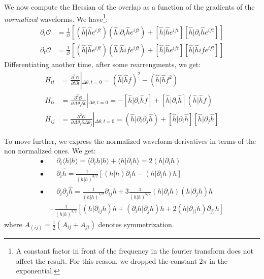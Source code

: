 \documentclass[twocolumn,showpacs,preprintnumbers,nofootinbib,prd,
superscriptaddress,10pt]{revtex4-1}
\newcommand{\scalar}[2]{\langle #1|#2 \rangle}
\newcommand{\rescalar}[2]{( #1|#2 )}
\newcommand{\imscalar}[2]{[ #1|#2 ]}
\begin{document}
We now compute the Hessian of the overlap as a function of the gradients of the {\it normalized} waveforms.
We have\footnote{
A constant factor in front of the frequency in the fourier transform does not affect the result. For this reason, we dropped the constant $2\pi$ in the exponential.}:
\begin{align}
	\partial_i \mathcal{O} &= \frac{1}{\mathcal{O}} \left[ \rescalar{\hat{h}}{\hat{h}e^{ift}}\rescalar{\hat{h}}{\partial_i\hat{h}e^{ift}} + \imscalar{\hat{h}}{\hat{h}e^{ift}}\imscalar{\hat{h}}{\partial_i\hat{h}e^{ift}} \right]\\
	\partial_t \mathcal{O} &= \frac{1}{\mathcal{O}} \left[ \rescalar{\hat{h}}{\hat{h}e^{ift}}\rescalar{\hat{h}}{\hat{h}if e^{ift}} + \imscalar{\hat{h}}{\hat{h}e^{ift}}\imscalar{\hat{h}}{\hat{h}if e^{ift}} \right]
\end{align}
Differentiating another time, after some rearrengments, we get:
\begin{align}
H_{tt} &= \frac{\partial^2 \mathcal{O}}{\partial t \partial t } \left|_{\Delta\theta, t = 0}
								= \rescalar{\hat{h}}{\hat{h}f}^2 - \rescalar{\hat{h}}{\hat{h}f^2} \label{eq:H_tt}\\
H_{ti} &= \frac{\partial^2 \mathcal{O}}{\partial \Delta \theta_i \partial t } \left|_{\Delta\theta, t = 0}
								= - \imscalar{\hat{h}}{\partial_i \hat{h}f} + \imscalar{\hat{h}}{\partial_i\hat{h}} \rescalar{\hat{h}}{\hat{h}f} \label{eq:H_ti}\\
H_{ij} &= \frac{\partial^2 \mathcal{O}}{\partial \Delta \theta_i \partial \Delta \theta_j }\left|_{\Delta\theta, t = 0}
								= \rescalar{\hat{h}}{\partial_i\partial_j\hat{h}} +\imscalar{\hat{h}}{\partial_i\hat{h}} \imscalar{\hat{h}}{\partial_j\hat{h}} \label{eq:H_ij}
\end{align}

To move further, we express the normalized waveform derivatives in terms of the non normalized ones. We get:
\begin{align*}
	\bullet&\quad \partial_i \scalar{h}{h} = \scalar{\partial_i h}{h}+ \scalar{h}{\partial_i h} = 2 \rescalar{h}{\partial_i h} \\
	\bullet&\quad \partial_i \hat{h} =\frac{1}{\rescalar{h}{h}^{3/2}} \left[ \rescalar{h}{h}\partial_i h -  \rescalar{h}{\partial_i h} h \right]	\\
	\bullet &\quad \partial_i \partial_j \hat{h} = \frac{1}{\rescalar{h}{h}^{1/2}} \partial_{ij}h 	+3 \frac{1}{\rescalar{h}{h}^{5/2}} \rescalar{h}{\partial_i h}\rescalar{h}{\partial_j h}h \\
	&- \frac{1}{\rescalar{h}{h}^{3/2}} \left[\rescalar{h}{ \partial_{ij} h} h + \rescalar{\partial_i h}{\partial_j h}  h
		+2\rescalar{h}{\partial_{(i} h} \partial_{j)} h \right]
\end{align*}
where $A_{(ij)} = \frac{1}{2}(A_{ij}+A_{ji})$ denotes symmetrization.
\end{document}
